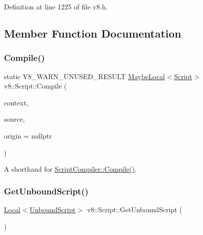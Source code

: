 Definition at line 1225 of file v8.\+h.



\subsection{Member Function Documentation}
\mbox{\label{classv8_1_1Script_a1793e3022a87f5a574df10bff8b42762}} 
\subsubsection{\texorpdfstring{Compile()}{Compile()}}
{\footnotesize\ttfamily static V8\+\_\+\+W\+A\+R\+N\+\_\+\+U\+N\+U\+S\+E\+D\+\_\+\+R\+E\+S\+U\+LT \mbox{\hyperlink{classv8_1_1MaybeLocal}{Maybe\+Local}}$<$\mbox{\hyperlink{classv8_1_1Script}{Script}}$>$ v8\+::\+Script\+::\+Compile (\begin{DoxyParamCaption}\item[{\mbox{\hyperlink{classv8_1_1Local}{Local}}$<$ Context $>$}]{context,  }\item[{\mbox{\hyperlink{classv8_1_1Local}{Local}}$<$ \mbox{\hyperlink{classv8_1_1String}{String}} $>$}]{source,  }\item[{\mbox{\hyperlink{classv8_1_1ScriptOrigin}{Script\+Origin}} $\ast$}]{origin = {\ttfamily nullptr} }\end{DoxyParamCaption})\hspace{0.3cm}{\ttfamily [static]}}

A shorthand for \mbox{\hyperlink{classv8_1_1ScriptCompiler_a217bcf520f4ed70f6f02afeabfe60319}{Script\+Compiler\+::\+Compile()}}. \mbox{\label{classv8_1_1Script_afac25cad452a61897c375c2b881e2070}} 
\subsubsection{\texorpdfstring{Get\+Unbound\+Script()}{GetUnboundScript()}}
{\footnotesize\ttfamily \mbox{\hyperlink{classv8_1_1Local}{Local}}$<$\mbox{\hyperlink{classv8_1_1UnboundScript}{Unbound\+Script}}$>$ v8\+::\+Script\+::\+Get\+Unbound\+Script (\begin{DoxyParamCaption}{ }\end{DoxyParamCaption})}

